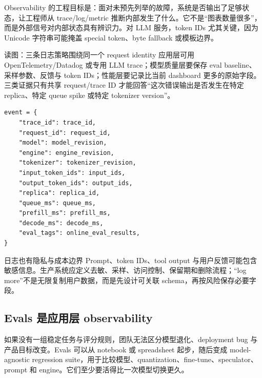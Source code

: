 Observability 的工程目标是：面对未预先列举的故障，系统是否输出了足够状态，让工程师从 trace/log/metric 推断内部发生了什么。它不是“图表数量很多”，而是外部信号对内部状态具有辨识力。对 LLM 服务，token IDs 尤其关键，因为 Unicode 字符串可能掩盖 special token、byte fallback 或模板边界。


\begin{knowledgebox}{读图：三条日志策略围绕同一个 request identity}
应用层可用 OpenTelemetry/Datadog 或专用 LLM trace；模型质量层要保存 eval baseline、采样参数、反馈与 token IDs；性能层要记录比当前 dashboard 更多的原始字段。三类证据只有共享 request/trace ID 才能回答“这次错误输出是否发生在特定 replica、特定 queue spike 或特定 tokenizer version”。
\end{knowledgebox}

\begin{lstlisting}[caption={可关联 correctness 与 performance 的结构化日志}]
event = {
    "trace_id": trace_id,
    "request_id": request_id,
    "model": model_revision,
    "engine": engine_revision,
    "tokenizer": tokenizer_revision,
    "input_token_ids": input_ids,
    "output_token_ids": output_ids,
    "replica": replica_id,
    "queue_ms": queue_ms,
    "prefill_ms": prefill_ms,
    "decode_ms": decode_ms,
    "eval_tags": online_eval_results,
}
\end{lstlisting}

\begin{warningbox}{日志也有隐私与成本边界}
Prompt、token IDs、tool output 与用户反馈可能包含敏感信息。生产系统应定义去敏、采样、访问控制、保留期和删除流程；“log more”不是无限复制用户数据，而是先设计可关联 schema，再按风险保存必要字段。
\end{warningbox}

\subsection{Evals 是应用层 observability}

如果没有一组稳定任务与评分规则，团队无法区分模型退化、deployment bug 与产品目标改变。Evals 可以从 notebook 或 spreadsheet 起步，随后变成 model-agnostic regression suite，用于比较模型、quantization、fine-tune、speculator、prompt 和 engine。它们至少要活得比一次模型切换更久。



